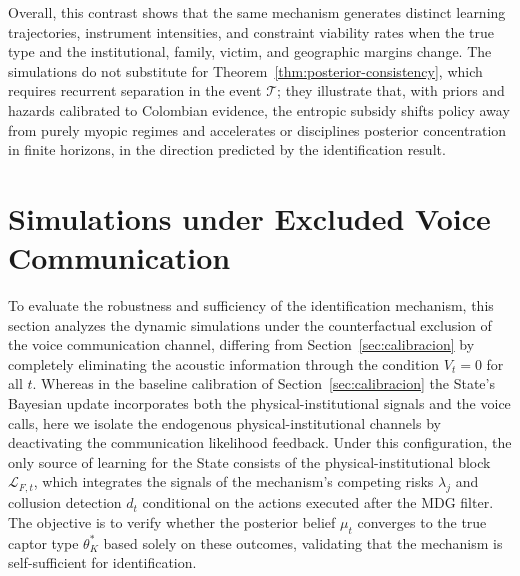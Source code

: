 \documentclass[pdflatex,sn-mathphys-ay]{sn-jnl}
\theoremstyle{plain}
\theoremstyle{definition}
\newcommand{\1}{\mathbf{1}}
\begin{document}
Overall, this contrast shows that the same mechanism generates distinct learning trajectories, instrument intensities, and constraint viability rates when the true type and the institutional, family, victim, and geographic margins change. The simulations do not substitute for Theorem~\ref{thm:posterior-consistency}, which requires recurrent separation in the event $\mathcal{T}$; they illustrate that, with priors and hazards calibrated to Colombian evidence, the entropic subsidy shifts policy away from purely myopic regimes and accelerates or disciplines posterior concentration in finite horizons, in the direction predicted by the identification result.

\section{Simulations under Excluded Voice Communication}\label{sec:no-voice}

To evaluate the robustness and sufficiency of the identification mechanism, this section analyzes the dynamic simulations under the counterfactual exclusion of the voice communication channel, differing from Section~\ref{sec:calibracion} by completely eliminating the acoustic information through the condition $V_t = 0$ for all $t$. Whereas in the baseline calibration of Section~\ref{sec:calibracion} the State's Bayesian update incorporates both the physical-institutional signals and the voice calls, here we isolate the endogenous physical-institutional channels by deactivating the communication likelihood feedback. Under this configuration, the only source of learning for the State consists of the physical-institutional block $\mathcal{L}_{F,t}$, which integrates the signals of the mechanism's competing risks $\lambda_j$ and collusion detection $d_t$ conditional on the actions executed after the MDG filter. The objective is to verify whether the posterior belief $\mu_t$ converges to the true captor type $\theta_K^\ast$ based solely on these outcomes, validating that the mechanism is self-sufficient for identification.
\end{document}
